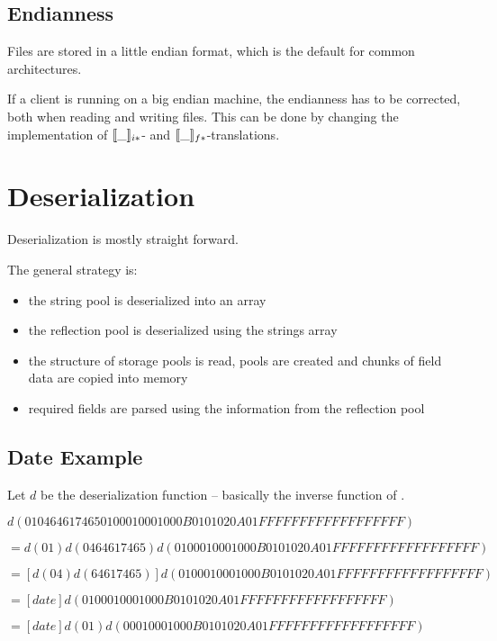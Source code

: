 \subsection{Endianness}

Files are stored in a little endian format, which is the default for common architectures.

If a client is running on a big endian machine, the endianness has to be corrected, both when reading and writing files. This can be done by changing the implementation of $[\![\_]\!]_{i*}$- and $[\![\_]\!]_{f*}$-translations.



\section{Deserialization}

Deserialization is mostly straight forward.

The general strategy is:
\begin{itemize}
 \item the string pool is deserialized into an array
 \item the reflection pool is deserialized using the strings array
 \item the structure of storage pools is read, pools are created and chunks of field data are copied into memory
 \item required fields are parsed using the information from the reflection pool
\end{itemize}

\subsection*{Date Example}

Let $d$ be the deserialization function -- basically the inverse function of \den{\_}.

$d(01 04 64 61  74 65 01 00  01 00 01 00  0B 01  01 02  0A 01 FF FF  FF FF FF FF  FF FF FF)$

$=d(01)d(04 64 61  74 65)d(01 00  01 00 01 00  0B 01  01 02  0A 01 FF FF  FF FF FF FF  FF FF FF)$

$=[d(04) d(64 61  74 65)] d(01 00  01 00 01 00  0B 01  01 02  0A 01 FF FF  FF FF FF FF  FF FF FF)$

$=[date] d(01 00  01 00 01 00  0B 01  01 02  0A 01 FF FF  FF FF FF FF  FF FF FF)$

$=[date] d(01) d(00  01 00 01 00  0B 01  01 02  0A 01 FF FF  FF FF FF FF  FF FF FF)$

